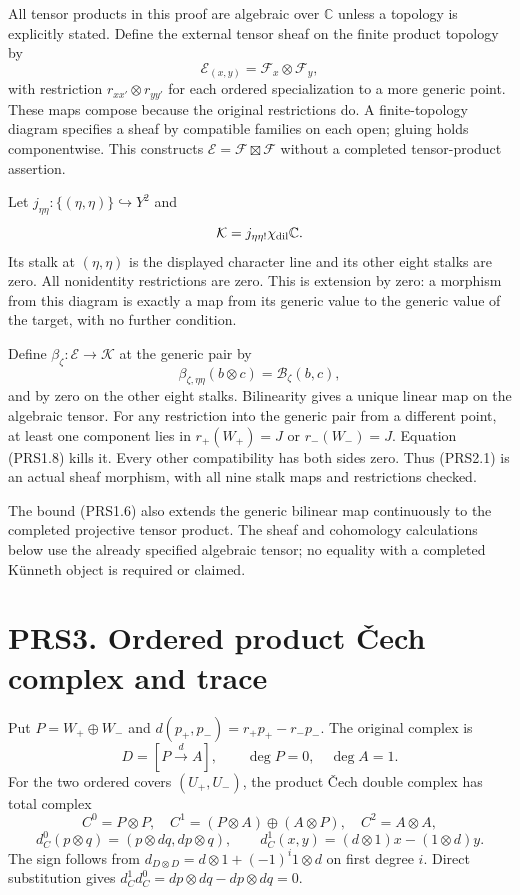 All tensor products in this proof are algebraic over \(\mathbb C\)
unless a topology is explicitly stated. Define the external tensor sheaf
on the finite product topology by \[
\mathcal E_{(x,y)}=\mathcal F_x\otimes\mathcal F_y,
\] with restriction \(r_{xx'}\otimes r_{yy'}\) for each ordered
specialization to a more generic point. These maps compose because the
original restrictions do. A finite-topology diagram specifies a sheaf by
compatible families on each open; gluing holds componentwise. This
constructs \(\mathcal E=\mathcal F\boxtimes\mathcal F\) without a
completed tensor-product assertion.

Let \(j_{\eta\eta}:\{(\eta,\eta)\}\hookrightarrow Y^2\) and \[
\mathcal K=j_{\eta\eta!}\chi_{\rm dil}\mathbb C.
\] Its stalk at \((\eta,\eta)\) is the displayed character line and its
other eight stalks are zero. All nonidentity restrictions are zero. This
is extension by zero: a morphism from this diagram is exactly a map from
its generic value to the generic value of the target, with no further
condition.

Define \(\beta_\zeta:\mathcal E\to\mathcal K\) at the generic pair by \[
\beta_{\zeta,\eta\eta}(b\otimes c)=\mathcal B_\zeta(b,c),
\tag{PRS2.1}
\] and by zero on the other eight stalks. Bilinearity gives a unique
linear map on the algebraic tensor. For any restriction into the generic
pair from a different point, at least one component lies in
\(r_+(W_+)=J\) or \(r_-(W_-)=J\). Equation (PRS1.8) kills it. Every
other compatibility has both sides zero. Thus (PRS2.1) is an actual
sheaf morphism, with all nine stalk maps and restrictions checked.

The bound (PRS1.6) also extends the generic bilinear map continuously to
the completed projective tensor product. The sheaf and cohomology
calculations below use the already specified algebraic tensor; no
equality with a completed Künneth object is required or claimed.

\section{PRS3. Ordered product Čech complex and
trace}\label{prs3.-ordered-product-ux10dech-complex-and-trace}

Put \(P=W_+\oplus W_-\) and \(d(p_+,p_-)=r_+p_+-r_-p_-\). The original
complex is \[
D=[P\xrightarrow{d}A],\qquad \deg P=0,\quad\deg A=1.
\] For the two ordered covers \((U_+,U_-)\), the product Čech double
complex has total complex \[
C^0=P\otimes P,\quad
C^1=(P\otimes A)\oplus(A\otimes P),\quad
C^2=A\otimes A,
\] \[
d_C^0(p\otimes q)=(p\otimes dq,dp\otimes q),\qquad
d_C^1(x,y)=(d\otimes1)x-(1\otimes d)y.
\tag{PRS3.1}
\] The sign follows from \(d_{D\otimes D}=d\otimes1+(-1)^i1\otimes d\)
on first degree \(i\). Direct substitution gives
\(d_C^1d_C^0=dp\otimes dq-dp\otimes dq=0\).

